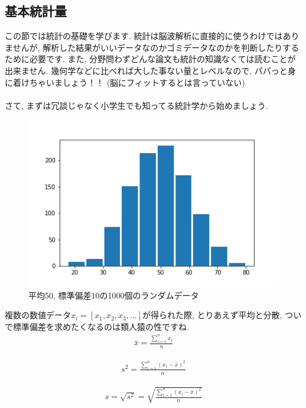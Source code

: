 \documentclass[11pt,a4paper]{jreport}
\begin{document}
\subsection{基本統計量}
この節では統計の基礎を学びます. 統計は脳波解析に直接的に使うわけではありませんが, 解析した結果がいいデータなのかゴミデータなのかを判断したりするために必要です. また, 分野問わずどんな論文も統計の知識なくては読むことが出来ません. 幾何学などに比べれば大した事ない量とレベルなので, パパっと身に着けちゃいましょう！！ (脳にフィットするとは言っていない)\\
\\
さて, まずは冗談じゃなく小学生でも知ってる統計学から始めましょう.\\

\begin{figure}[H]
\label{im:histgram}
  \centering
  \includegraphics[width=120mm,bb=0 0 432 288]{figures/hist.png}
  \caption{平均50, 標準偏差10の1000個のランダムデータ}
\end{figure}

複数の数値データ$x_i = [x_1, x_2, x_3, ...]$が得られた際, とりあえず平均と分散, ついで標準偏差を求めたくなるのは類人猿の性ですね.\\
\begin{eqnarray}
\label{eq:ave}
\bar{x} = \frac{\sum_{i=1}^{n} x_i}{n}
\end{eqnarray}

\begin{eqnarray}
\label{eq:var}
s^2 = \frac{\sum_{i=1}^{n} (x_i - \bar{x})^2}{n}
\end{eqnarray}

\begin{eqnarray}
\label{eq:dev}
s = \sqrt{s^2} = \sqrt{\frac{\sum_{i=1}^{n} (x_i - \bar{x})^2}{n}}
\end{eqnarray}
\end{document}

